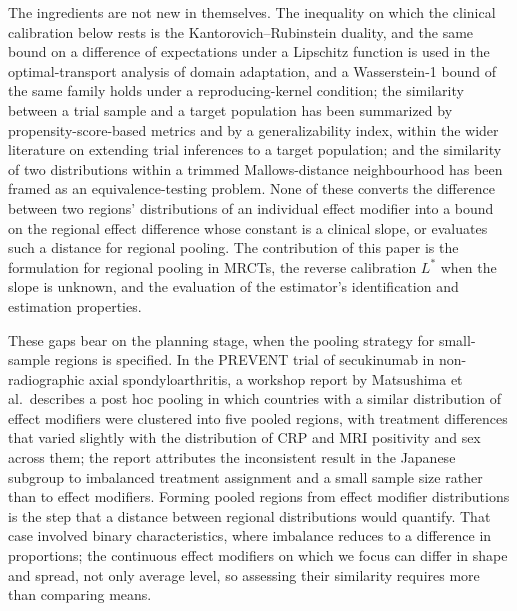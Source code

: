 \documentclass[AMA,Times1COL]{WileyNJDv5}
\begin{document}
The ingredients are not new in themselves. The inequality on which the clinical calibration below rests is the Kantorovich--Rubinstein duality, and the same bound on a difference of expectations under a Lipschitz function is used in the optimal-transport analysis of domain adaptation,\cite{shen2018} and a Wasserstein-1 bound of the same family holds under a reproducing-kernel condition;\cite{redko2017} the similarity between a trial sample and a target population has been summarized by propensity-score-based metrics\cite{stuart2011} and by a generalizability index,\cite{tipton2014} within the wider literature on extending trial inferences to a target population;\cite{dahabreh2020} and the similarity of two distributions within a trimmed Mallows-distance neighbourhood has been framed as an equivalence-testing problem.\cite{munk1998} None of these converts the difference between two regions' distributions of an individual effect modifier into a bound on the regional effect difference whose constant is a clinical slope, or evaluates such a distance for regional pooling. The contribution of this paper is the formulation for regional pooling in MRCTs, the reverse calibration $L^*$ when the slope is unknown, and the evaluation of the estimator's identification and estimation properties.

These gaps bear on the planning stage, when the pooling strategy for small-sample regions is specified. In the PREVENT trial of secukinumab in non-radiographic axial spondyloarthritis, a workshop report by Matsushima et al.\ describes a post hoc pooling in which countries with a similar distribution of effect modifiers were clustered into five pooled regions, with treatment differences that varied slightly with the distribution of CRP and MRI positivity and sex across them; the report attributes the inconsistent result in the Japanese subgroup to imbalanced treatment assignment and a small sample size rather than to effect modifiers.\cite{matsushima2024} Forming pooled regions from effect modifier distributions is the step that a distance between regional distributions would quantify. That case involved binary characteristics, where imbalance reduces to a difference in proportions; the continuous effect modifiers on which we focus can differ in shape and spread, not only average level, so assessing their similarity requires more than comparing means.
\end{document}
